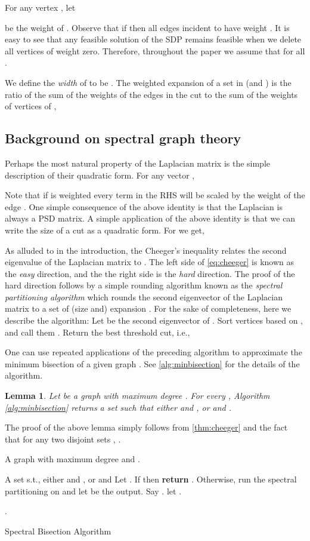 \documentclass[11pt]{article}
\newcommand{\Input}{\item[{\bf Input:}]}
\newcommand{\Output}{\item[{\bf Output:}]}
\renewcommand{\Return}{\item[{\bf return}]}
\newtheorem{lemma}{Lemma}[section]
\begin{document}
For any vertex , let  

be the weight of .
Observe that if  then all edges incident to  have weight . It is easy to see that any feasible solution of the SDP remains feasible when we delete all vertices of weight zero.
Therefore, throughout the paper we assume that  for all .

We define the \emph{width} of  to be . 
The weighted expansion of a set  in  (and ) is the ratio of the sum of the weights of the edges in the cut  to the sum of the 
weights of vertices of ,


\subsection{Background on spectral graph theory}
\label{sec:spectralgraphtheory}
Perhaps the most natural property 	of the Laplacian matrix is the simple description of their quadratic form. For any vector , 

Note that if  is weighted every term in the RHS will be scaled by the weight of the edge .
One simple consequence of the above identity is that the Laplacian is always a PSD matrix. 
A simple application of the above identity is that we can write the size of a cut  as a quadratic form. For  we get,  
 

As alluded to in the introduction, the Cheeger's inequality relates the second eigenvalue of the Laplacian matrix to . The left side of \eqref{eq:cheeger} is known as the \emph{easy} direction, and the the right side is the \emph{hard} direction. The proof of the hard direction follows by a simple rounding algorithm known as the \emph{spectral partitioning algorithm} which rounds the second eigenvector of the Laplacian matrix to a set  of (size  and) expansion . 
For the sake of completeness, here we describe the algorithm:
Let  be the second eigenvector of . Sort vertices based on , and call them . Return the best threshold cut, i.e., 



One can use repeated applications of the preceding algorithm to approximate the minimum bisection of a given graph . See \autoref{alg:minbisection} for the details of the algorithm. 
\begin{lemma}
\label{lem:bisection}
 Let  be a graph with maximum degree . For every , Algorithm \ref{alg:minbisection} returns a set  such that either  and , or  and .
\end{lemma}
The proof of the above lemma simply follows from \autoref{thm:cheeger} and the fact that for any two disjoint sets , .
\begin{algorithm}
\begin{algorithmic}[1]
	\Input A graph  with maximum degree  and .
	\Output A set  s.t., either   and , or   and 
	\State Let .
	\While{ }	
		\State If  then \textbf{return} .
			 \label{line:returnexpander} 
		\State Otherwise, run the spectral partitioning on  and let  be the output.
		 	\State Say . let . 
	\EndWhile
	\Return .
\end{algorithmic}
\caption{Spectral Bisection Algorithm}
\label{alg:minbisection}
\end{algorithm}
\end{document}
